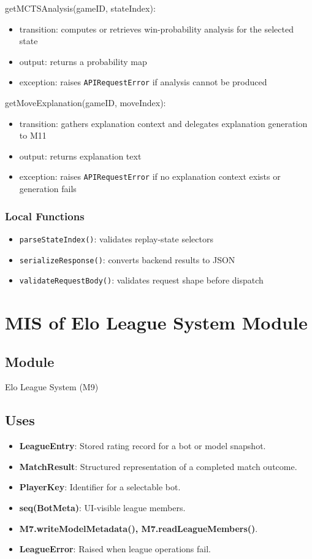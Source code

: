 \documentclass[12pt, titlepage]{article}
\begin{document}
\noindent getMCTSAnalysis(gameID, stateIndex):
\begin{itemize}
\item transition: computes or retrieves win-probability analysis for the selected state
\item output: returns a probability map
\item exception: raises \texttt{APIRequestError} if analysis cannot be produced
\end{itemize}

\noindent getMoveExplanation(gameID, moveIndex):
\begin{itemize}
\item transition: gathers explanation context and delegates explanation generation to M11
\item output: returns explanation text
\item exception: raises \texttt{APIRequestError} if no explanation context exists or generation fails
\end{itemize}

\subsubsection{Local Functions}
\begin{itemize}
\item \texttt{parseStateIndex()}: validates replay-state selectors
\item \texttt{serializeResponse()}: converts backend results to JSON
\item \texttt{validateRequestBody()}: validates request shape before dispatch
\end{itemize}



\section{MIS of Elo League System Module} \label{M9}

\subsection{Module}
Elo League System (M9)

\subsection{Uses}
\begin{itemize}
    \item \textbf{LeagueEntry}: Stored rating record for a bot or model snapshot.
    \item \textbf{MatchResult}: Structured representation of a completed match outcome.
    \item \textbf{PlayerKey}: Identifier for a selectable bot.
    \item \textbf{seq(BotMeta)}: UI-visible league members.
    \item \textbf{M7.writeModelMetadata(), M7.readLeagueMembers()}.
    \item \textbf{LeagueError}: Raised when league operations fail.
\end{itemize}
\end{document}
